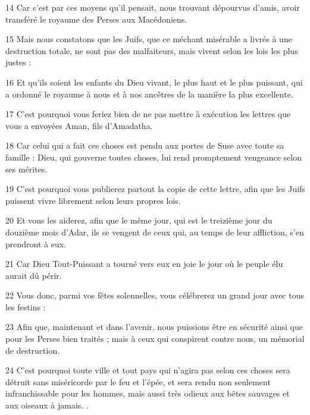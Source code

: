 \par 14 Car c'est par ces moyens qu'il pensait, nous trouvant dépourvus d'amis, avoir transféré le royaume des Perses aux Macédoniens.
\par 15 Mais nous constatons que les Juifs, que ce méchant misérable a livrés à une destruction totale, ne sont pas des malfaiteurs, mais vivent selon les lois les plus justes :
\par 16 Et qu'ils soient les enfants du Dieu vivant, le plus haut et le plus puissant, qui a ordonné le royaume à nous et à nos ancêtres de la manière la plus excellente.
\par 17 C'est pourquoi vous feriez bien de ne pas mettre à exécution les lettres que vous a envoyées Aman, fils d'Amadatha.
\par 18 Car celui qui a fait ces choses est pendu aux portes de Suse avec toute sa famille : Dieu, qui gouverne toutes choses, lui rend promptement vengeance selon ses mérites.
\par 19 C'est pourquoi vous publierez partout la copie de cette lettre, afin que les Juifs puissent vivre librement selon leurs propres lois.
\par 20 Et vous les aiderez, afin que le même jour, qui est le treizième jour du douzième mois d'Adar, ils se vengent de ceux qui, au temps de leur affliction, s'en prendront à eux.
\par 21 Car Dieu Tout-Puissant a tourné vers eux en joie le jour où le peuple élu aurait dû périr.
\par 22 Vous donc, parmi vos fêtes solennelles, vous célébrerez un grand jour avec tous les festins :
\par 23 Afin que, maintenant et dans l'avenir, nous puissions être en sécurité ainsi que pour les Perses bien traités ; mais à ceux qui conspirent contre nous, un mémorial de destruction.
\par 24 C'est pourquoi toute ville et tout pays qui n'agira pas selon ces choses sera détruit sans miséricorde par le feu et l'épée, et sera rendu non seulement infranchissable pour les hommes, mais aussi très odieux aux bêtes sauvages et aux oiseaux à jamais. .

